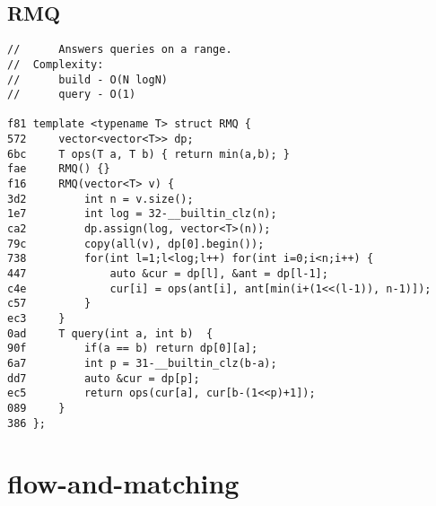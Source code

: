 \documentclass[11pt, a4paper, twoside]{article}
\begin{document}
\subsection{RMQ}
\begin{lstlisting}
//      Answers queries on a range.
//  Complexity: 
// 		build - O(N logN)
// 		query - O(1)

f81 template <typename T> struct RMQ {
572 	vector<vector<T>> dp;
6bc 	T ops(T a, T b) { return min(a,b); }
fae 	RMQ() {}
f16 	RMQ(vector<T> v) {
3d2 		int n = v.size();
1e7 		int log = 32-__builtin_clz(n);
ca2 		dp.assign(log, vector<T>(n));
79c 		copy(all(v), dp[0].begin());
738 		for(int l=1;l<log;l++) for(int i=0;i<n;i++) {
447 			auto &cur = dp[l], &ant = dp[l-1];
c4e 			cur[i] = ops(ant[i], ant[min(i+(1<<(l-1)), n-1)]);
c57 		}
ec3 	}
0ad 	T query(int a, int b)  {
90f 		if(a == b) return dp[0][a];
6a7 		int p = 31-__builtin_clz(b-a);
dd7 		auto &cur = dp[p];
ec5 		return ops(cur[a], cur[b-(1<<p)+1]);
089 	}
386 };
\end{lstlisting}



%
%

\section{flow-and-matching}
\end{document}
